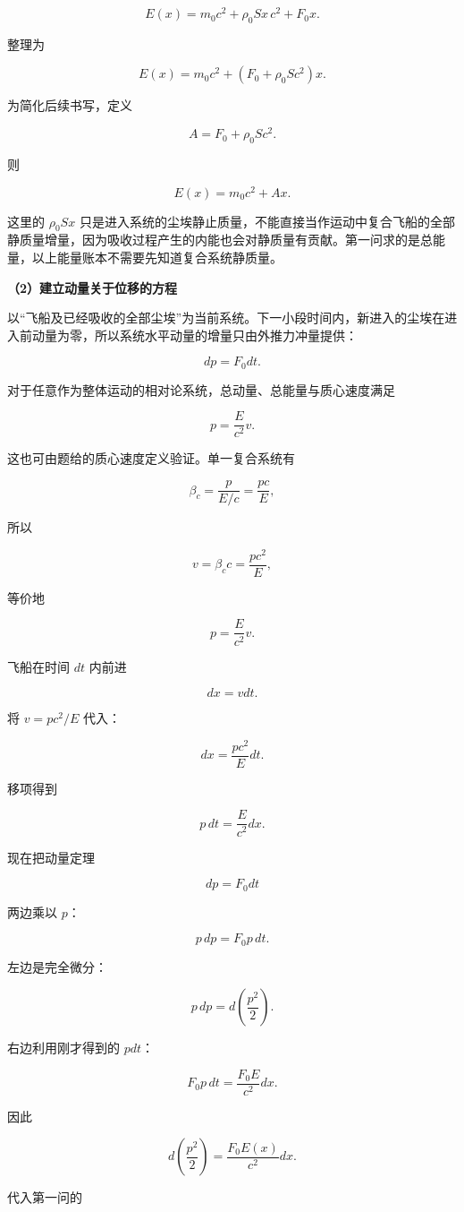 \documentclass[12pt,a4paper,UTF8]{ctexart}
\begin{document}
\[E(x)=m_0c^2+\rho_0Sx\,c^2+F_0x.\]

整理为

\[\boxed{
E(x)=m_0c^2+\left(F_0+\rho_0Sc^2\right)x
}.\]

为简化后续书写，定义

\[A=F_0+\rho_0Sc^2.\]

则

\[E(x)=m_0c^2+Ax.\]

这里的 \(\rho_0Sx\)
只是进入系统的尘埃静止质量，不能直接当作运动中复合飞船的全部静质量增量，因为吸收过程产生的内能也会对静质量有贡献。第一问求的是总能量，以上能量账本不需要先知道复合系统静质量。

\textbf{（2）建立动量关于位移的方程}

以``飞船及已经吸收的全部尘埃''为当前系统。下一小段时间内，新进入的尘埃在进入前动量为零，所以系统水平动量的增量只由外推力冲量提供：

\[dp=F_0dt.\]

对于任意作为整体运动的相对论系统，总动量、总能量与质心速度满足

\[p=\frac{E}{c^2}v.\]

这也可由题给的质心速度定义验证。单一复合系统有

\[\beta_c=\frac{p}{E/c}=\frac{pc}{E},\]

所以

\[v=\beta_cc=\frac{pc^2}{E},\]

等价地

\[p=\frac{E}{c^2}v.\]

飞船在时间 \(dt\) 内前进

\[dx=vdt.\]

将 \(v=pc^2/E\) 代入：

\[dx=\frac{pc^2}{E}dt.\]

移项得到

\[p\,dt=\frac{E}{c^2}dx.\]

现在把动量定理

\[dp=F_0dt\]

两边乘以 \(p\)：

\[p\,dp=F_0p\,dt.\]

左边是完全微分：

\[p\,dp=d\left(\frac{p^2}{2}\right).\]

右边利用刚才得到的 \(pdt\)：

\[F_0p\,dt=\frac{F_0E}{c^2}dx.\]

因此

\[d\left(\frac{p^2}{2}\right)
=\frac{F_0E(x)}{c^2}dx.\]

代入第一问的
\end{document}

